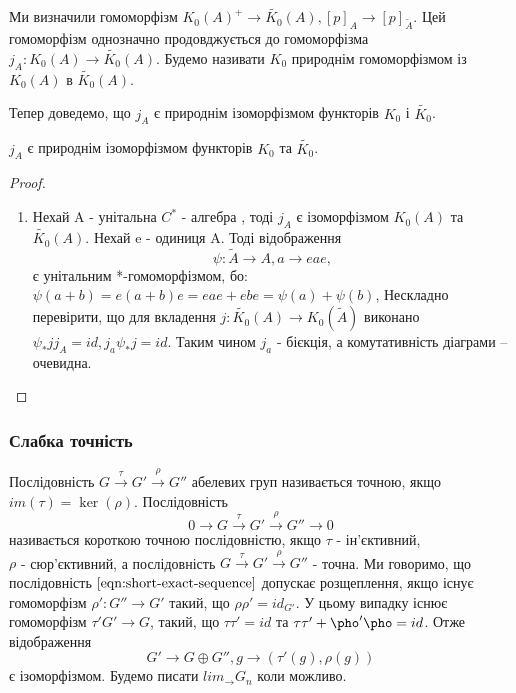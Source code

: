 Ми визначили гомоморфізм $K_0(A)^+ \rightarrow  \widetilde{K_0}(A), [p]_A \rightarrow [p]_{\widetilde{A}}$.
Цей гомоморфізм однозначно продовджується до гомоморфізма $j_A: K_0(A) \rightarrow \widetilde{K_0}(A)$.
Будемо називати $K_0$ природнім гомоморфізмом із $K_0(A)$ в $\widetilde{K_0}(A)$.

Тепер доведемо, що $j_A$ є природнім ізоморфізмом функторів $K_0$ і $\widetilde{K_0}$.
\begin{theorem}
    $j_A$ є природнім ізоморфізмом функторів $ K_0 $ та $ \widetilde{K_0} $.
    \begin{proof}
        \begin{enumerate}
            \item Нехай A - унітальна $C^*$ - алгебра , тоді $j_A$ є ізоморфізмом $ K_0(A) $ та $ \widetilde{K_0}(A) $.
            Нехай e - одиниця A. Тоді відображення
            \begin{equation*}
                \psi: \widetilde{A} \rightarrow A, a \rightarrow e a e,
            \end{equation*}
            є унітальним *-гомоморфізмом, бо: $\psi(a + b) = e(a + b)e = eae + ebe = \psi(a) + \psi(b)$,
            Нескладно перевірити, що для вкладення $j: \widetilde{K_0}(A) \rightarrow K_0(\widetilde{A})$
            виконано $\psi_* j j_A = id, j_a \psi_* j = id$. Таким чином $j_a$ - бієкція, а комутативність діаграми --
            очевидна.
        \end{enumerate}
    \end{proof}
\end{theorem}

\subsubsection{Слабка точність}
\begin{definition}
    Послідовність $G \xrightarrow{\tau} G' \xrightarrow{\rho} G''$ абелевих
    груп називається точною, якщо $im(\tau) = \ker(\rho)$.
    Послідовність
    \begin{equation}
        \label{eqn:short-exact-sequence}
        0 \rightarrow G \xrightarrow{\tau} G' \xrightarrow{\rho} G'' \rightarrow 0
    \end{equation}
    називається короткою точною послідовністю, якщо $\tau$ - ін'єктивний, \\
    $\rho$ - сюр'єктивний, а послідовність $G \xrightarrow{\tau} G' \xrightarrow{\rho} G''$ - точна.
    Ми говоримо, що послідовність $\ref{eqn:short-exact-sequence}$ допускає
    розщеплення, якщо існує гомоморфізм $\rho': G'' \rightarrow G'$ такий,
    що $\rho \rho' = id_{G'}$.
    У цьому випадку існює гомоморфізм $\tau' G' \rightarrow G$, такий, що
    $\tau \tau' = id$ та $\tau \tau' + \pho' \pho = id$.
    Отже відображення
    \[
        G' \rightarrow G \oplus G'', g \rightarrow (\tau'(g), \rho(g))
    \]
    є ізоморфізмом.
    Будемо писати $lim_{\rightarrow} G_n$ коли можливо.
\end{definition}

